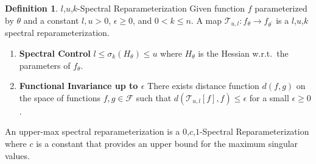 \documentclass{article}
\theoremstyle{plain}
\theoremstyle{definition}
\newtheorem{definition}[theorem]{Definition}
\theoremstyle{remark}
\begin{document}
\begin{definition}{$l$,$u$,$k$-Spectral Reparameterization}
\label{def:luk-spectral-reparameterization}
Given function $f$ parameterized by $\theta$ and a constant $l,u > 0$, $\epsilon \geq 0$, and $0 < k \leq n$. A map $\mathcal{T}_{u,l}: f_\theta \to f_{\theta^\prime}$ is a $l$,$u$,$k$ spectral reparameterization.
\begin{enumerate}
    \item \textbf{Spectral Control} $l \leq \sigma_k(H_{\theta}) \leq u$ where $H_{\theta}$ is the Hessian w.r.t.\ the parameters of $f_{\theta}$.
    \item \textbf{Functional Invariance up to $\epsilon$} There exists distance function $d(f, g)$ on the space of functions $f,g \in \mathcal{F}$ such that  $d(\mathcal{T}_{u,l}[f], f) \leq \epsilon $ for a small $\epsilon \geq 0$.
\end{enumerate}
\end{definition}

An upper-max spectral reparameterization is a $0$,$c$,$1$-Spectral Reparameterization where $c$ is a constant that provides an upper bound for the maximum singular values.
\end{document}
